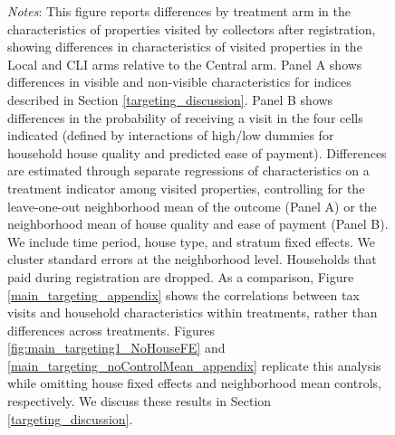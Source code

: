 \documentclass[12pt,english]{article}
\renewcommand{\footnotesize}{\fontsize{9pt}{11pt}\selectfont}\usepackage[unicode=true,
\begin{document}
\begin{figure}[H]
\parbox{6in}{\footnotesize \textit{Notes}: This figure reports differences by treatment arm in the characteristics of properties visited by collectors after registration, showing differences in characteristics of visited properties in the Local and CLI arms relative to the Central arm.  Panel A shows differences in visible and non-visible characteristics for indices described in Section \ref{targeting_discussion}.  Panel B shows differences in the probability of receiving a visit in the four cells indicated (defined by interactions of high/low dummies for household house quality and predicted ease of payment). Differences are estimated through separate regressions of characteristics on a treatment indicator among visited properties, controlling for the leave-one-out neighborhood mean of the outcome (Panel A) or the neighborhood mean of house quality and ease of payment (Panel B). We include time period, house type, and stratum fixed effects. We cluster standard errors at the neighborhood level. Households that paid during registration are dropped. As a comparison, Figure \ref{main_targeting_appendix} shows the correlations between tax visits and household characteristics within treatments, rather than differences across treatments. Figures \ref{fig:main_targeting1_NoHouseFE} and \ref{main_targeting_noControlMean_appendix} replicate this analysis while omitting house fixed effects and neighborhood mean controls, respectively. We discuss these results in Section \ref{targeting_discussion}.}
\end{figure}
\end{document}
